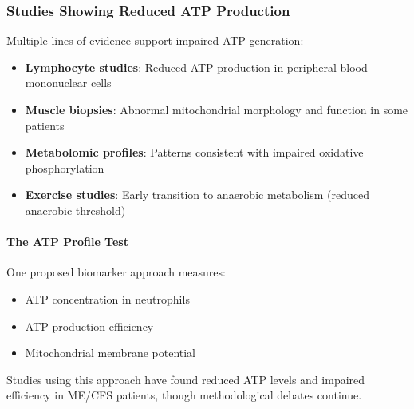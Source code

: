 \subsubsection{Studies Showing Reduced ATP Production}

Multiple lines of evidence support impaired ATP generation:

\begin{itemize}
    \item \textbf{Lymphocyte studies}: Reduced ATP production in peripheral blood mononuclear cells
    \item \textbf{Muscle biopsies}: Abnormal mitochondrial morphology and function in some patients
    \item \textbf{Metabolomic profiles}: Patterns consistent with impaired oxidative phosphorylation
    \item \textbf{Exercise studies}: Early transition to anaerobic metabolism (reduced anaerobic threshold)
\end{itemize}

\paragraph{The ATP Profile Test}
One proposed biomarker approach measures:
\begin{itemize}
    \item ATP concentration in neutrophils
    \item ATP production efficiency
    \item Mitochondrial membrane potential
\end{itemize}

Studies using this approach have found reduced ATP levels and impaired efficiency in ME/CFS patients, though methodological debates continue.

